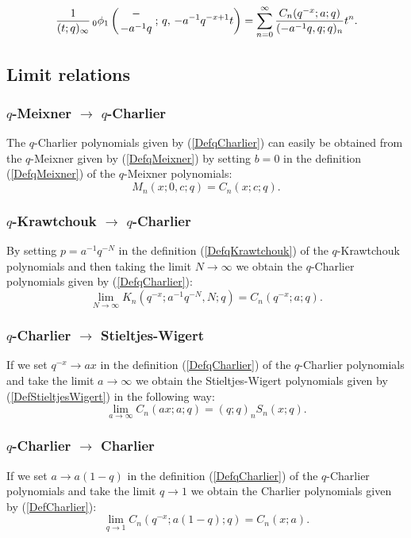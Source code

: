 \documentclass[envcountchap,graybox]{svmono}
\newcounter{rom}
\newcommand{\qhyp}[5]{\mbox{}_{#1}{\phi}_{#2}
\left(\genfrac{}{}{0pt}{}{#3}{#4}\,;\,q,\,#5\right)}
\newcommand{\qhyp}[5]{\,\mbox{}_{#1}\phi_{#2}\!\left(
  \genfrac{}{}{0pt}{}{#3}{#4};#5\right)}
\begin{document}
{{\begin{equation}
\label{GenqCharlier2}
\frac{1}{(t;q)_{\infty}}\,\qhyp{0}{1}{-}{-a^{-1}q}{-a^{-1}q^{-x+1}t}
=\sum_{n=0}^{\infty}\frac{C_n(q^{-x};a;q)}{(-a^{-1}q,q;q)_n}t^n.
\end{equation}

\subsection*{Limit relations}

\subsubsection*{$q$-Meixner $\rightarrow$ $q$-Charlier}
The $q$-Charlier polynomials given by (\ref{DefqCharlier}) can easily be
obtained from the $q$-Meixner given by (\ref{DefqMeixner}) by setting $b=0$
in the definition (\ref{DefqMeixner}) of the $q$-Meixner polynomials:
\begin{equation}
M_n(x;0,c;q)=C_n(x;c;q).
\end{equation}

\subsubsection*{$q$-Krawtchouk $\rightarrow$ $q$-Charlier}
By setting $p=a^{-1}q^{-N}$ in the definition (\ref{DefqKrawtchouk}) of the
$q$-Krawtchouk polynomials and then taking the limit $N\rightarrow\infty$ we
obtain the $q$-Charlier polynomials given by (\ref{DefqCharlier}):
$$\lim_{N\rightarrow\infty}K_n(q^{-x};a^{-1}q^{-N},N;q)=C_n(q^{-x};a;q).$$

\subsubsection*{$q$-Charlier $\rightarrow$ Stieltjes-Wigert}
If we set $q^{-x}\rightarrow ax$ in the definition (\ref{DefqCharlier}) of the
$q$-Charlier polynomials and take the limit $a\rightarrow\infty$ we obtain
the Stieltjes-Wigert polynomials given by (\ref{DefStieltjesWigert}) in the
following way:
\begin{equation}
\lim_{a\rightarrow\infty}C_n(ax;a;q)=(q;q)_nS_n(x;q).
\end{equation}

\subsubsection*{$q$-Charlier $\rightarrow$ Charlier}
If we set $a\rightarrow a(1-q)$ in the definition (\ref{DefqCharlier})
of the $q$-Charlier polynomials and take the limit $q\rightarrow 1$ we obtain the
Charlier polynomials given by (\ref{DefCharlier}):
\begin{equation}
\lim_{q\rightarrow 1}C_n(q^{-x};a(1-q);q)=C_n(x;a).
\end{equation}

}}
\end{document}
